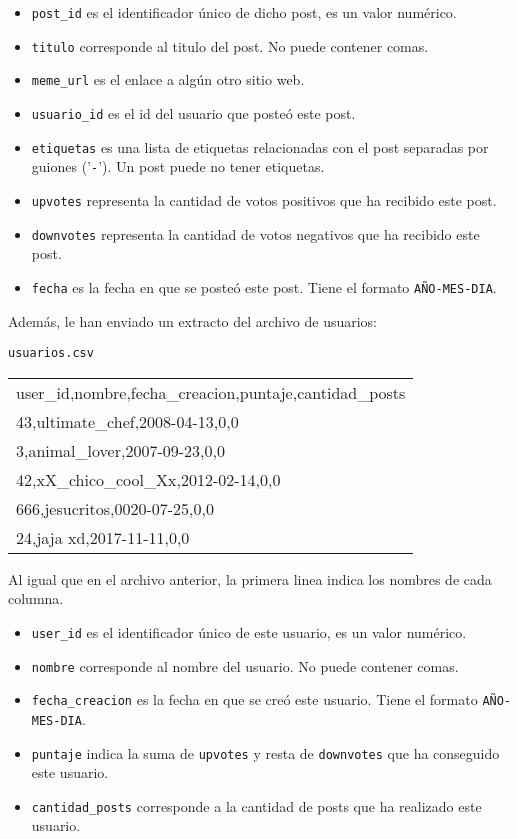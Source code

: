 \begin{itemize}
\itemsep0em 
    \item \texttt{post\_id} es el identificador único de dicho post, es un valor numérico.
    \item \texttt{titulo} corresponde al titulo del post. No puede contener comas.
    \item \texttt{meme\_url} es el enlace a algún otro sitio web.
    \item \texttt{usuario\_id} es el id del usuario que posteó este post.
    \item \texttt{etiquetas} es una lista de etiquetas relacionadas con el post separadas por guiones ('\texttt{-}'). Un post puede no tener etiquetas.
    \item \texttt{upvotes} representa la cantidad de votos positivos que ha recibido este post.
    \item \texttt{downvotes} representa la cantidad de votos negativos que ha recibido este post.
    \item \texttt{fecha} es la fecha en que se posteó este post. Tiene el formato \texttt{AÑO-MES-DIA}.
\end{itemize}

Además, le han enviado un extracto del archivo de usuarios:
\begin{center}
    \texttt{usuarios.csv} \\
	\begin{tabular}{|l|}
		\hline
user\_id,nombre,fecha\_creacion,puntaje,cantidad\_posts\\
43,ultimate\_chef,2008-04-13,0,0\\
3,animal\_lover,2007-09-23,0,0\\
42,xX\_chico\_cool\_Xx,2012-02-14,0,0\\
666,jesucritos,0020-07-25,0,0\\
24,jaja xd,2017-11-11,0,0\\
		\hline
	\end{tabular}
\end{center}

Al igual que en el archivo anterior, la primera linea indica los nombres de cada columna.

\begin{itemize}
\itemsep0em 
    \item \texttt{user\_id} es el identificador único de este usuario, es un valor numérico.
    \item \texttt{nombre} corresponde al nombre del usuario. No puede contener comas.
    \item \texttt{fecha\_creacion} es la fecha en que se creó este usuario. Tiene el formato \texttt{AÑO-MES-DIA}.
    \item \texttt{puntaje} indica la suma de \texttt{upvotes} y resta de \texttt{downvotes} que ha conseguido este usuario.
    \item \texttt{cantidad\_posts} corresponde a la cantidad de posts que ha realizado este usuario.
\end{itemize}

